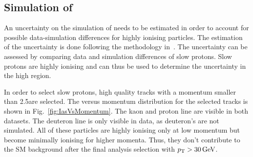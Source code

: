 \subsection*{Simulation of \ias}
An uncertainty on the simulation of \ias needs to be estimated in order to account for possible data-simulation differences for highly ionising particles.
The estimation of the \ias uncertainty is done following the methodology in~\cite{bib:CMS:HSCP_8TeV,bib:CMS:HSCP_8TeV_AN}.
The \ias uncertainty can be assessed by comparing data and simulation differences of slow protons.
Slow protons are highly ionising and can thus be used to determine the uncertainty in the high \ias region.

In order to select slow protons, high quality tracks with a momentum smaller than 2.5\gev are selected.
The \ias versus momentum distribution for the selected tracks is shown in Fig.~\ref{fig:IasVsMomentum}.
The kaon and proton line are visible in both datasets. 
The deuteron line is only visible in data, as deuteron's are not simulated.
All of these particles are highly ionising only at low momentum but become minimally ionising for higher momenta.
Thus, they don't contribute to the SM background after the final analysis selection with $p_{\text{T}}>30\,\text{Ge}\kern-0.06667em\text{V}$.


